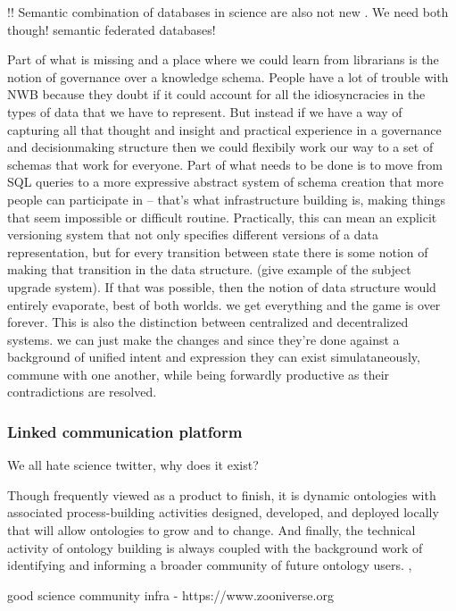 \documentclass{article}
\begin{document}
!! Semantic combination of databases in science are also not new \cite{cheungSemanticWebApproach2007,simaEnablingSemanticQueries2019}.
We need both though! semantic federated databases!

Part of what is missing and a place where we could learn from librarians
is the notion of governance over a knowledge schema. People have a lot
of trouble with NWB because they doubt if it could account for all the
idiosyncracies in the types of data that we have to represent. But
instead if we have a way of capturing all that thought and insight and
practical experience in a governance and decisionmaking structure then
we could flexibily work our way to a set of schemas that work for
everyone. Part of what needs to be done is to move from SQL queries to a
more expressive abstract system of schema creation that more people can
participate in -- that's what infrastructure building is, making things
that seem impossible or difficult routine. Practically, this can mean an
explicit versioning system that not only specifies different versions of
a data representation, but for every transition between state there is
some notion of making that transition in the data structure. (give
example of the subject upgrade system). If that was possible, then the
notion of data structure would entirely evaporate, best of both worlds.
we get everything and the game is over forever. This is also the
distinction between centralized and decentralized systems. we can just
make the changes and since they're done against a background of unified
intent and expression they can exist simulataneously, commune with one
another, while being forwardly productive as their contradictions are
resolved.

\hypertarget{linked-communication-platform}{%
\subsubsection{Linked communication
platform}\label{linked-communication-platform}}

We all hate science twitter, why does it exist?

\begin{leftbar}
Though frequently viewed as a product to finish, it is dynamic
ontologies with associated process-building activities designed,
developed, and deployed locally that will allow ontologies to grow and
to change. And finally, the technical activity of ontology building is
always coupled with the background work of identifying and informing a
broader community of future ontology users. \cite{bowkerInformationInfrastructureStudies2010},\end{leftbar}
good science community infra - https://www.zooniverse.org
\end{document}
